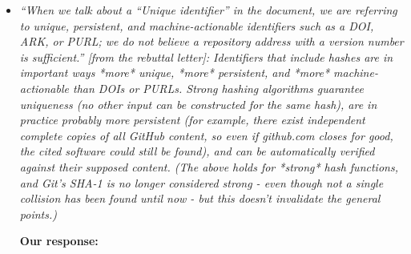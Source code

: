 \documentclass{article}
\begin{document}
\begin{enumerate}
\begin{itemize}
\item \emph{``When we talk about a ``Unique identifier'' in the document, we
are referring to unique, persistent, and machine-actionable identifiers such as
a DOI, ARK, or PURL; we do not believe a repository address with a version
number is sufficient.'' [from the rebuttal letter]: Identifiers that include
hashes are in important ways *more* unique, *more* persistent, and *more*
machine-actionable than DOIs or PURLs. Strong hashing algorithms guarantee
uniqueness (no other input can be constructed for the same hash), are in
practice probably more persistent (for example, there exist independent
complete copies of all GitHub content, so even if github.com closes for good,
the cited software could still be found), and can be automatically verified
against their supposed content. (The above holds for *strong* hash functions,
and Git's SHA-1 is no longer considered strong - even though not a single
collision has been found until now - but this doesn't invalidate the general
points.)}

\textbf{Our response:}


\end{itemize}

\end{enumerate}

%
%
\end{document}
